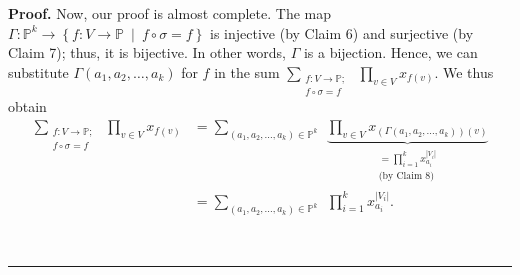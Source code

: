 \documentclass[numbers=enddot,12pt,final,onecolumn,notitlepage]{scrartcl}%
\numberwithin{exer}{section}
\theoremstyle{definition}
\newenvironment{proof}[1][Proof]{\noindent\textbf{#1.} }{\ \rule{0.5em}{0.5em}}
\let\sumnonlimits\sum
\let\prodnonlimits\prod
\renewcommand{\sum}{\sumnonlimits\limits}
\renewcommand{\prod}{\prodnonlimits\limits}
\newenvironment{verlong}{}{}
\begin{document}
\begin{verlong}
\begin{proof}
Now, our proof is almost complete. The map $\Gamma:\mathbb{P}^{k}%
\rightarrow\left\{  f:V\rightarrow\mathbb{P}\ \mid\ f\circ\sigma=f\right\}  $
is injective (by Claim 6) and surjective (by Claim 7); thus, it is bijective.
In other words, $\Gamma$ is a bijection. Hence, we can substitute
$\Gamma\left(  a_{1},a_{2},\ldots,a_{k}\right)  $ for $f$ in the sum
$\sum_{\substack{f:V\rightarrow\mathbb{P}\text{;}\\f\circ\sigma=f}%
}\ \ \prod_{v\in V}x_{f\left(  v\right)  }$. We thus obtain%
\begin{align}
\sum_{\substack{f:V\rightarrow\mathbb{P}\text{;}\\f\circ\sigma=f}%
}\ \ \prod_{v\in V}x_{f\left(  v\right)  }  &  =\sum_{\left(  a_{1}%
,a_{2},\ldots,a_{k}\right)  \in\mathbb{P}^{k}}\ \ \underbrace{\prod_{v\in
V}x_{\left(  \Gamma\left(  a_{1},a_{2},\ldots,a_{k}\right)  \right)  \left(
v\right)  }}_{\substack{=\prod_{i=1}^{k}x_{a_{i}}^{\left\vert V_{i}\right\vert
}\\\text{(by Claim 8)}}}\nonumber\\
&  =\sum_{\left(  a_{1},a_{2},\ldots,a_{k}\right)  \in\mathbb{P}^{k}}%
\ \ \prod_{i=1}^{k}x_{a_{i}}^{\left\vert V_{i}\right\vert }.
\label{pf.lem.ptype-as-sum.lhs=}%
\end{align}



\end{proof}
\end{verlong}
\end{document}
